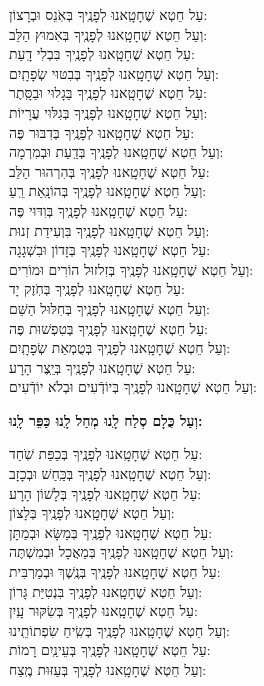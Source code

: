 \documentclass[twoside, openany, parskip=half, 11pt]{book}
\begin{document}
\begin{mdframed}[innerrightmargin=40pt,linecolor=white]

עַל חֵטְא שֶׁחָטָֽאנוּ לְפָנֶֽיךָ בְּאֹֽנֵס וּבְרָצוֹן:\\ 	וְעַל חֵטְא שֶׁחָטָֽאנוּ לְפָנֶֽיךָ בְּאִמוּץ הַלֵּב:	\\
עַל חֵטְא שֶׁחָטָֽאנוּ לְפָנֶֽיךָ בִּבְלִי דָֽעַת: \\	וְעַל חֵטְא שֶׁחָטָֽאנוּ לְפָנֶֽיךָ בְּבִטּוּי שְׂפָתָֽיִם:\\
עַל חֵטְא שֶׁחָטָֽאנוּ לְפָנֶֽיךָ בַּגָלוּי וּבַסָּֽתֶר: \\	וְעַל חֵטְא שֶׁחָטָֽאנוּ לְפָנֶֽיךָ בְּגִלּוּי עֲרָיוֹת:	\\
עַל חֵטְא שֶׁחָטָֽאנוּ לְפָנֶֽיךָ בְּדִבּוּר פֶּה: \\ 	וְעַל חֵטְא שֶׁחָטָֽאנוּ לְפָנֶֽיךָ בְּדַֽעַת וּבְמִרְמָה: \\
עַל חֵטְא שֶׁחָטָֽאנוּ לְפָנֶֽיךָ בְּהִרְהוּר הַלֵּב: \\	וְעַל חֵטְא שֶׁחָטָֽאנוּ לְפָנֶֽיךָ בְּהוֹנָֽאַת רֵֽעַ:	\\
עַל חֵטְא שֶׁחָטָֽאנוּ לְפָנֶֽיךָ בְּוִדּוּי פֶּה:\\	וְעַל חֵטְא שֶׁחָטָֽאנוּ לְפָנֶֽיךָ בִּוְעִידַת זְנוּת:	\\
עַל חֵטְא שֶׁחָטָֽאנוּ לְפָנֶֽיךָ בְּזָדוֹן וּבִשְׁגָגָה: \\	וְעַל חֵטְא שֶׁחָטָֽאנוּ לְפָנֶֽיךָ בְּזִלזוּל הוֹרִים וּמוֹרִים:\\
עַל חֵטְא שֶׁחָטָֽאנוּ לְפָנֶֽיךָ בְּחֹֽזֶק יָד: \\ 	וְעַל חֵטְא שֶׁחָטָֽאנוּ לְפָנֶֽיךָ בְּחִלּוּל הַשֵּׁם:	\\
עַל חֵטְא שֶׁחָטָֽאנוּ לְפָנֶֽיךָ בְּטִפְשׁוּת פֶּה: \\ 	וְעַל חֵטְא שֶׁחָטָֽאנוּ לְפָנֶֽיךָ בְּטֻמְאַת שְׂפָתָֽיִם:	\\
עַל חֵטְא שֶׁחָטָֽאנוּ לְפָנֶֽיךָ בְּיֵֽצֶר הָרָע: \\	וְעַל חֵטְא שֶׁחָטָֽאנוּ לְפָנֶֽיךָ בְּיוֹדְֿעִים וּבְלֹא יוֹדְֿעִים:

\textbf{וְעַל כֻּלָם סְלַח לָֽנוּ מְחַל לָֽנוּ כַּפֵּר לָֽנוּ:}

עַל חֵטְא שֶׁחָטָֽאנוּ לְפָנֶֽיךָ בְּכַפַּת שֹֽׁחַד: \\	וְעַל חֵטְא שֶׁחָטָֽאנוּ לְפָנֶֽיךָ בְּכַּֽחַשׁ וּבְכָזָב:	\\
עַל חֵטְא שֶׁחָטָֽאנוּ לְפָנֶֽיךָ בְּלָשׁוֹן הָרָע:\\	וְעַל חֵטְא שֶׁחָטָֽאנוּ לְפָנֶֽיךָ בְּלָצוֹן:\\
עַל חֵטְא שֶׁחָטָֽאנוּ לְפָנֶֽיךָ בְּמַשָּׂא וּבְמַתָּן: \\	וְעַל חֵטְא שֶׁחָטָֽאנוּ לְפָנֶֽיךָ בְּמַאֲכָל וּבְמִשְׁתֶּה:\\
עַל חֵטְא שֶׁחָטָֽאנוּ לְפָנֶֽיךָ בְּנֶֽשֶׁךְ וּבְמַרְבִּית:\\ וְעַל חֵטְא שֶׁחָטָֽאנוּ לְפָנֶֽיךָ בִּנְטִיַּת גָּרוֹן:	\\
עַל חֵטְא שֶׁחָטָֽאנוּ לְפָנֶֽיךָ בְּשִׂקּוּר עָֽיִן:\\ וְעַל חֵטְא שֶׁחָטָֽאנוּ לְפָנֶֽיךָ בְּשִֽׂיחַ שִׂפְתוֹתֵֽינוּ:	\\
עַל חֵטְא שֶׁחָטָֽאנוּ לְפָנֶֽיךָ בְּעֵינַֽיִם רָמוֹת:\\ וְעַל חֵטְא שֶׁחָטָֽאנוּ לְפָנֶֽיךָ בְּעַזּוּת מֶֽצַח:


\end{mdframed}
\end{document}
